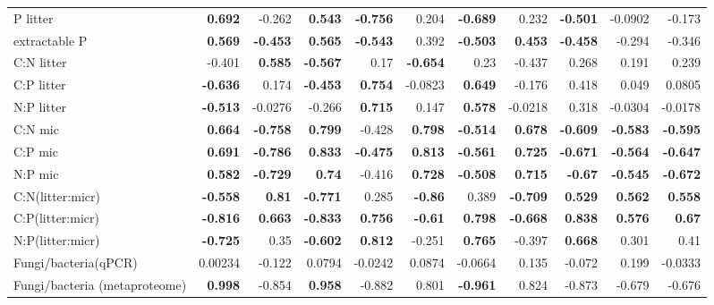 \documentclass[10pt]{article}
\begin{document}
\begin{flushleft}
\begin{landscape}
\begin{table}[h!]
{\begin{tabular}{lrrrrrrrrrr}
  P litter & \textbf{ 0.692 } & -0.262 & \textbf{ 0.543 } & \textbf{ -0.756 } & 0.204 & \textbf{ -0.689 } & 0.232 & \textbf{ -0.501 } & -0.0902 & -0.173 \\ 
  extractable P & \textbf{ 0.569 } & \textbf{ -0.453 } & \textbf{ 0.565 } & \textbf{ -0.543 } & 0.392 & \textbf{ -0.503 } & \textbf{ 0.453 } & \textbf{ -0.458 } & -0.294 & -0.346 \\ 
  C:N litter & -0.401 & \textbf{ 0.585 } & \textbf{ -0.567 } & 0.17 & \textbf{ -0.654 } & 0.23 & -0.437 & 0.268 & 0.191 & 0.239 \\ 
  C:P litter & \textbf{ -0.636 } & 0.174 & \textbf{ -0.453 } & \textbf{ 0.754 } & -0.0823 & \textbf{ 0.649 } & -0.176 & 0.418 & 0.049 & 0.0805 \\ 
  N:P litter & \textbf{ -0.513 } & -0.0276 & -0.266 & \textbf{ 0.715 } & 0.147 & \textbf{ 0.578 } & -0.0218 & 0.318 & -0.0304 & -0.0178 \\ 
  C:N mic & \textbf{ 0.664 } & \textbf{ -0.758 } & \textbf{ 0.799 } & -0.428 & \textbf{ 0.798 } & \textbf{ -0.514 } & \textbf{ 0.678 } & \textbf{ -0.609 } & \textbf{ -0.583 } & \textbf{ -0.595 } \\ 
  C:P mic & \textbf{ 0.691 } & \textbf{ -0.786 } & \textbf{ 0.833 } & \textbf{ -0.475 } & \textbf{ 0.813 } & \textbf{ -0.561 } & \textbf{ 0.725 } & \textbf{ -0.671 } & \textbf{ -0.564 } & \textbf{ -0.647 } \\ 
  N:P mic & \textbf{ 0.582 } & \textbf{ -0.729 } & \textbf{ 0.74 } & -0.416 & \textbf{ 0.728 } & \textbf{ -0.508 } & \textbf{ 0.715 } & \textbf{ -0.67 } & \textbf{ -0.545 } & \textbf{ -0.672 } \\ 
  C:N(litter:micr) & \textbf{ -0.558 } & \textbf{ 0.81 } & \textbf{ -0.771 } & 0.285 & \textbf{ -0.86 } & 0.389 & \textbf{ -0.709 } & \textbf{ 0.529 } & \textbf{ 0.562 } & \textbf{ 0.558 } \\ 
  C:P(litter:micr) & \textbf{ -0.816 } & \textbf{ 0.663 } & \textbf{ -0.833 } & \textbf{ 0.756 } & \textbf{ -0.61 } & \textbf{ 0.798 } & \textbf{ -0.668 } & \textbf{ 0.838 } & \textbf{ 0.576 } & \textbf{ 0.67 } \\ 
  N:P(litter:micr) & \textbf{ -0.725 } & 0.35 & \textbf{ -0.602 } & \textbf{ 0.812 } & -0.251 & \textbf{ 0.765 } & -0.397 & \textbf{ 0.668 } & 0.301 & 0.41 \\ 
  Fungi/bacteria(qPCR) & 0.00234 & -0.122 & 0.0794 & -0.0242 & 0.0874 & -0.0664 & 0.135 & -0.072 & 0.199 & -0.0333 \\ 
  Fungi/bacteria (metaproteome) & \textbf{ 0.998 } & -0.854 & \textbf{ 0.958 } & -0.882 & 0.801 & \textbf{ -0.961 } & 0.824 & -0.873 & -0.679 & -0.676 \\ 

\end{tabular}}
\end{table}
\end{landscape}
\end{flushleft}
\end{document}
